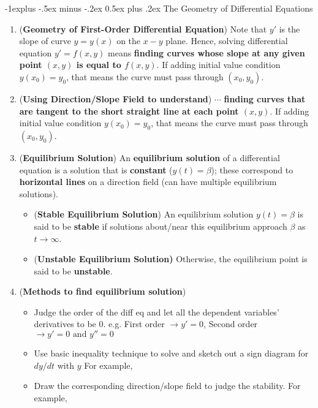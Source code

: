 \documentclass[10pt, landscape]{article}
\makeatletter
\renewcommand{\subsection}{\@startsection{subsection}{2}{0mm}%
                                {-1explus -.5ex minus -.2ex}%
                                {0.5ex plus .2ex}%
                                {\normalfont\normalsize\bfseries}}
\makeatother
\begin{document}
\begin{multicols}{4}
\subsection{The Geometry of Differential Equations}
\begin{enumerate}
    \item (\textbf{Geometry of First-Order Differential Equation}) Note that $y'$ is the slope of curve $y=y(x)$ on the $x-y$ plane. Hence, solving differential equation $y'=f(x,y)$ means \textbf{finding curves whose slope at any given point $(x,y)$ is equal to $f(x,y)$}. If adding initial value condition $y(x_0)=y_0$, that means the curve must pass through $(x_0, y_0)$.
    \item (\textbf{Using Direction/Slope Field to understand}) $\cdots$ \textbf{finding curves that are tangent to the short straight line at each point $(x,y)$}. If adding initial value condition $y(x_0)=y_0$, that means the curve must pass through $(x_0, y_0)$.
    \item (\textbf{Equilibrium Solution}) An \textbf{equilibrium solution} of a differential equation is a solution that is \textbf{constant} ($y(t)=\beta$); these correspond to \textbf{horizontal lines} on a direction field (can have multiple equilibrium solutions).
    \begin{itemize}
        \item (\textbf{Stable Equilibrium Solution}) An equilibrium solution $y(t)=\beta$ is said to be \textbf{stable} if solutions about/near this equilibrium approach $\beta$ as $t\to \infty$.
        \item (\textbf{Unstable Equilibrium Solution)} Otherwise, the equilibrium point is said to be \textbf{unstable}.
    \end{itemize}
    \item (\textbf{Methods to find equilibrium solution})
    \begin{itemize}
        \item Judge the order of the diff eq and let all the dependent variables' derivatives to be 0. e.g. First order $\rightarrow y'=0$, Second order $\rightarrow y'=0 \text{ and } y''=0$ 
        \item Use basic inequality technique to solve and sketch out a sign diagram for $dy/dt$ with $y$ For example,\\
        \item Draw the corresponding direction/slope field to judge the stability. For example,\\
    \end{itemize}
\end{enumerate}

\end{multicols}
\end{document}
